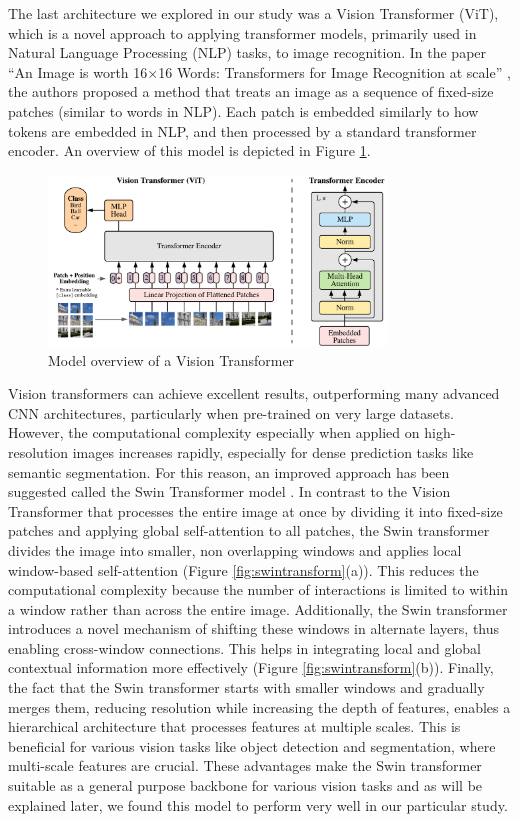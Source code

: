 The last architecture we explored in our study was a Vision Transformer (ViT), which is a novel approach to applying transformer models, primarily used in Natural Language Processing (NLP) tasks, to image recognition. In the paper ``An Image is worth 16$\times$16 Words: Transformers for Image Recognition at scale'' \cite{DBLP:journals/corr/abs-2010-11929}, the authors proposed a method that treats an image as a sequence of fixed-size patches (similar to words in NLP). Each patch is embedded similarly to how tokens are embedded in NLP, and then processed by a standard transformer encoder. An overview of this model is depicted in Figure \ref{fig:vit-arch}.

\begin{figure}
    \centering 
    \includegraphics[width=0.8\textwidth]{model_scheme.pdf}
    \caption{Model overview of a Vision Transformer \cite{DBLP:journals/corr/RonnebergerFB15}}
    \label{fig:vit-arch}
\end{figure}

Vision transformers can achieve excellent results, outperforming many advanced CNN architectures, particularly when pre-trained on very large datasets. However, the computational complexity especially when applied on high-resolution images increases rapidly, especially for dense prediction tasks like semantic segmentation. For this reason, an improved approach has been suggested called the Swin Transformer model \cite{DBLP:journals/corr/abs-2103-14030}. In contrast to the Vision Transformer that processes the entire image at once by dividing it into fixed-size patches and applying global self-attention to all patches, the Swin transformer divides the image into smaller, non overlapping windows and applies local window-based self-attention (Figure \ref{fig:swintransform}(a)). This reduces the computational complexity because the number of interactions is limited to within a window rather than across the entire image. Additionally, the Swin transformer introduces a novel mechanism of shifting these windows in alternate layers, thus enabling cross-window connections. This helps in integrating local and global contextual information more effectively (Figure \ref{fig:swintransform}(b)). Finally, the fact that the Swin transformer starts with smaller windows and gradually merges them, reducing resolution while increasing the depth of features, enables a hierarchical architecture that processes features at multiple scales. This is beneficial for various vision tasks like object detection and segmentation, where multi-scale features are crucial. These advantages make the Swin transformer suitable as a general purpose backbone for various vision tasks and as will be explained later, we found this model to perform very well in our particular study.

